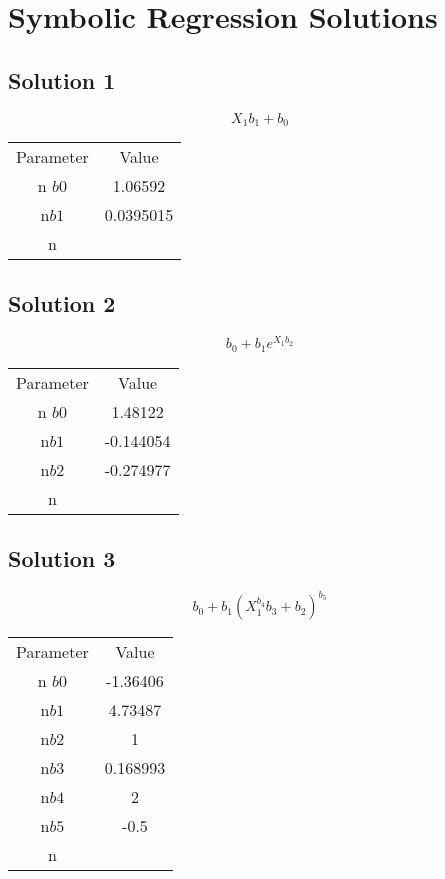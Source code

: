 \documentclass{article}
\begin{document}
\section*{Symbolic Regression Solutions}
\subsection*{Solution 1}
\[
X_{1} b_{1} + b_{0}
\]
\begin{center}
\begin{tabular}{cc}
\toprule
Parameter & Value \\n\midrule
$b0$ & 1.06592 \\n$b1$ & 0.0395015 \\n\bottomrule
\end{tabular}
\end{center}

\vspace{1em}
\subsection*{Solution 2}
\[
b_{0} + b_{1} e^{X_{1} b_{2}}
\]
\begin{center}
\begin{tabular}{cc}
\toprule
Parameter & Value \\n\midrule
$b0$ & 1.48122 \\n$b1$ & -0.144054 \\n$b2$ & -0.274977 \\n\bottomrule
\end{tabular}
\end{center}

\vspace{1em}
\subsection*{Solution 3}
\[
b_{0} + b_{1} \left(X_{1}^{b_{4}} b_{3} + b_{2}\right)^{b_{5}}
\]
\begin{center}
\begin{tabular}{cc}
\toprule
Parameter & Value \\n\midrule
$b0$ & -1.36406 \\n$b1$ & 4.73487 \\n$b2$ & 1 \\n$b3$ & 0.168993 \\n$b4$ & 2 \\n$b5$ & -0.5 \\n\bottomrule
\end{tabular}
\end{center}
\end{document}
